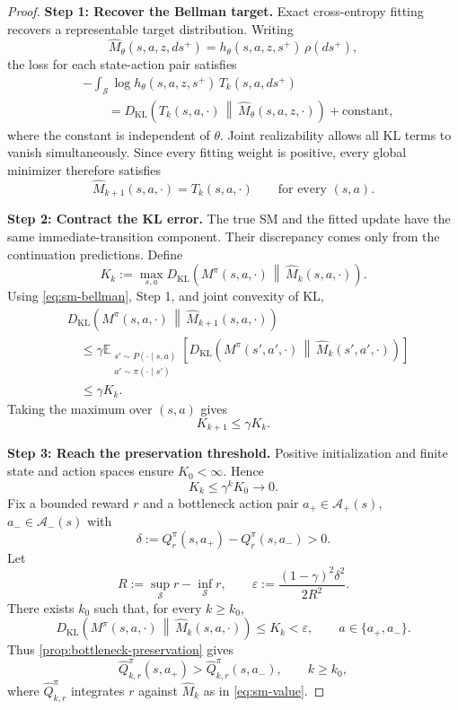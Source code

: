 \begin{proof}
\noindent\textbf{Step 1: Recover the Bellman target.}
Exact cross-entropy fitting recovers a representable target distribution.
Writing
\[
    \widehat M_\theta(s,a,z,ds^+)
    =h_\theta(s,a,z,s^+)\,\rho(ds^+),
\]
the loss for each state-action pair satisfies
\[
\begin{aligned}
    &-\int_{\mathcal S}
      \log h_\theta(s,a,z,s^+)\,T_k(s,a,ds^+)\\
    &\qquad=
    D_{\mathrm{KL}}\!\left(
        T_k(s,a,\cdot)
        \,\middle\|\,
        \widehat M_\theta(s,a,z,\cdot)
    \right)
    +\text{constant},
\end{aligned}
\]
where the constant is independent of $\theta$.
Joint realizability allows all KL terms to vanish simultaneously.
Since every fitting weight is positive, every global minimizer therefore satisfies
\[
    \widehat M_{k+1}(s,a,\cdot)=T_k(s,a,\cdot)
    \qquad\text{for every }(s,a).
\]

\noindent\textbf{Step 2: Contract the KL error.}
The true SM and the fitted update have the same immediate-transition component.
Their discrepancy comes only from the continuation predictions.
Define
\[
    K_k:=\max_{s,a}
    D_{\mathrm{KL}}\!\left(
        M^\pi(s,a,\cdot)
        \,\middle\|\,
        \widehat M_k(s,a,\cdot)
    \right).
\]
Using \eqref{eq:sm-bellman}, Step 1, and joint convexity of KL,
\[
\begin{aligned}
    &D_{\mathrm{KL}}\!\left(
        M^\pi(s,a,\cdot)
        \,\middle\|\,
        \widehat M_{k+1}(s,a,\cdot)
    \right)\\
    &\quad\le
    \gamma
    \mathbb E_{\substack{
        s'\sim P(\cdot\mid s,a)\\
        a'\sim\pi(\cdot\mid s')
    }}
    \left[
        D_{\mathrm{KL}}\!\left(
            M^\pi(s',a',\cdot)
            \,\middle\|\,
            \widehat M_k(s',a',\cdot)
        \right)
    \right]\\
    &\quad\le\gamma K_k.
\end{aligned}
\]
Taking the maximum over $(s,a)$ gives
\[
    K_{k+1}\le\gamma K_k.
\]

\noindent\textbf{Step 3: Reach the preservation threshold.}
Positive initialization and finite state and action spaces ensure $K_0<\infty$.
Hence
\[
    K_k\le\gamma^kK_0\longrightarrow0.
\]
Fix a bounded reward $r$ and a bottleneck action pair $a_+\in\mathcal A_+(s)$, $a_-\in\mathcal A_-(s)$ with
\[
    \delta:=Q_r^\pi(s,a_+)-Q_r^\pi(s,a_-)>0.
\]
Let
\[
    R:=\sup_{\mathcal S}r-\inf_{\mathcal S}r,
    \qquad
    \varepsilon:=\frac{(1-\gamma)^2\delta^2}{2R^2}.
\]
There exists $k_0$ such that, for every $k\ge k_0$,
\[
    D_{\mathrm{KL}}\!\left(
        M^\pi(s,a,\cdot)
        \,\middle\|\,
        \widehat M_k(s,a,\cdot)
    \right)
    \le K_k<\varepsilon,
    \qquad a\in\{a_+,a_-\}.
\]
Thus \cref{prop:bottleneck-preservation} gives
\[
    \widehat Q_{k,r}^\pi(s,a_+)>
    \widehat Q_{k,r}^\pi(s,a_-),
    \qquad k\ge k_0,
\]
where $\widehat Q_{k,r}^\pi$ integrates $r$ against $\widehat M_k$ as in \eqref{eq:sm-value}.
\end{proof}


